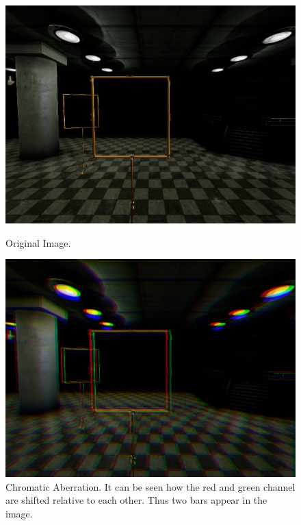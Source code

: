 \begin{figure}[bhtp]
	\centering
	\begin{minipage}{0.33\textwidth}
		\includegraphics[width=\textwidth]{fig/gate_example}
		\caption{Original Image.}
		\label{fig:orig}
	\end{minipage}
	\begin{minipage}{0.33\textwidth}
		\includegraphics[width=\textwidth]{fig/gate_example_chromatic}
		\caption{Chromatic Aberration. It can be seen how the red and green channel are shifted relative to each other. Thus two bars appear in the image.} 		
		\label{fig:chromatic}
	\end{minipage}
	\begin{minipage}{0.33\textwidth}

\end{minipage}
\end{figure}

